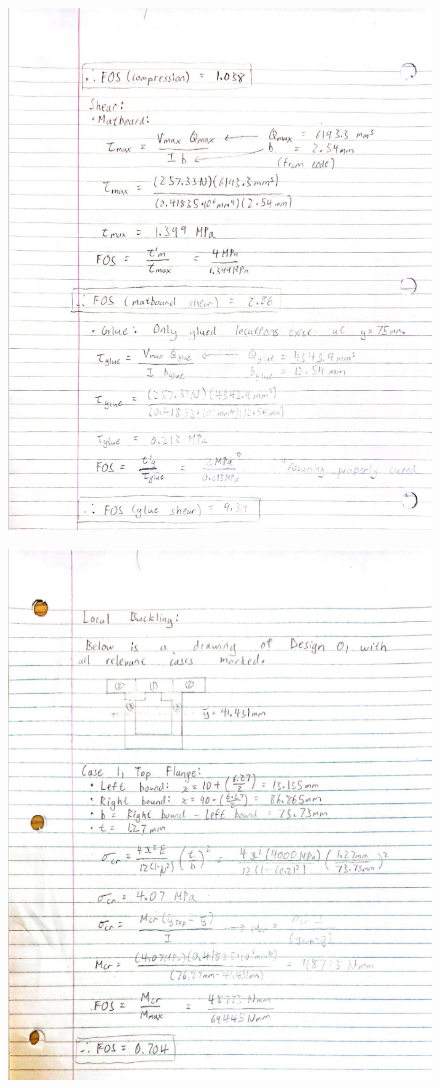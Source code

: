 \documentclass[11pt]{article}
\begin{document}
\begin{figure}[H]
    \centering
    \includegraphics[width=0.95\linewidth]{images/D0 Hand Calcs P2.png}
\end{figure}

\begin{figure}[H]
    \centering
    \includegraphics[width=0.95\linewidth]{images/D0 Hand Calcs P3.png}
\end{figure}
\end{document}
